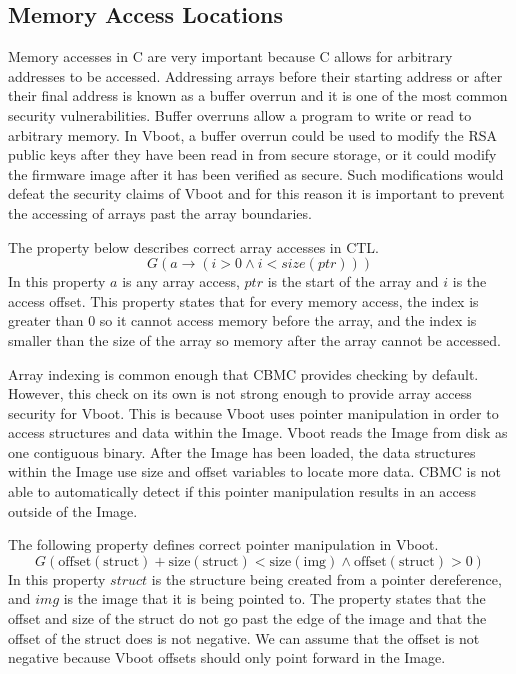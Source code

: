 \subsection{Memory Access Locations}\label{my-malloc}

Memory accesses in C are very important because C allows for arbitrary addresses to be accessed. 
Addressing arrays before their starting address or after their final address is known as a buffer overrun and it is one of the most common security vulnerabilities. 
Buffer overruns allow a program to write or read to arbitrary memory. 
In Vboot, a buffer overrun could be used to modify the RSA public keys after they have been read in from secure storage, or it could modify the firmware image after it has been verified as secure. 
Such modifications would defeat the security claims of Vboot and for this reason it is important to prevent the accessing of arrays past the array boundaries.

The property below describes correct array accesses in CTL. 
\begin{equation}
    G(a \to (i > 0 \land i < size(ptr)))
\end{equation}
In this property $a$ is any array access, $ptr$ is the start of the array and $i$ is the access offset.
This property states that for every memory access, the index is greater than 0 so it cannot access memory before the array,  and the index is smaller than the size of the array so memory after the array cannot be accessed.

Array indexing is common enough that CBMC provides checking by default.
However, this check on its own is not strong enough to provide array access security for Vboot. 
This is because Vboot uses pointer manipulation in order to access structures and data within the Image. 
Vboot reads the Image from disk as one contiguous binary. 
After the Image has been loaded, the data structures within the Image use size and offset variables to locate more data.
CBMC is not able to automatically detect if this pointer manipulation results in an access outside of the Image.

The following property defines correct pointer manipulation in Vboot. 
\begin{equation}
    G(\text{offset}(\text{struct}) + \text{size}(\text{struct}) <
    \text{size}(\text{img}) \land \text{offset}(\text{struct}) > 0)
\end{equation}
In this property $struct$ is the structure being created from a pointer dereference, and $img$ is the image that it is being pointed to.
The property states that the offset and size of the struct do not go past the edge of the image and that the offset of the struct does is not negative.
We can assume that the offset is not negative because Vboot offsets should only point forward in the Image.

